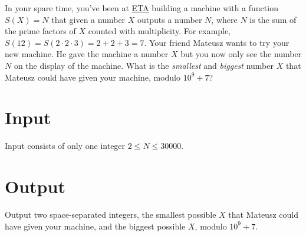 
In your spare time, you've been at \href{https://eta.chalmers.se/}{ETA} building a machine with a
function $S(X) = N$ that given a number $X$ outputs a number $N$, where $N$ is the sum of the prime
factors of $X$ counted with multiplicity. For example, $S(12) = S(2 \cdot 2 \cdot 3) = 2 + 2 + 3 =
7$. Your friend Mateusz wants to try your new machine. He gave the machine a number $X$ but you now
only see the number $N$ on the display of the machine. What is the \textit{smallest} and
\textit{biggest} number $X$ that Mateusz could have given your machine, modulo $10^9 + 7$?

\section*{Input}
Input consists of only one integer $2 \le N \le 30000$.

\section*{Output}
Output two space-separated integers, the smallest possible $X$ that Mateusz could have given your
machine, and the biggest possible $X$, modulo $10^9 + 7$.
